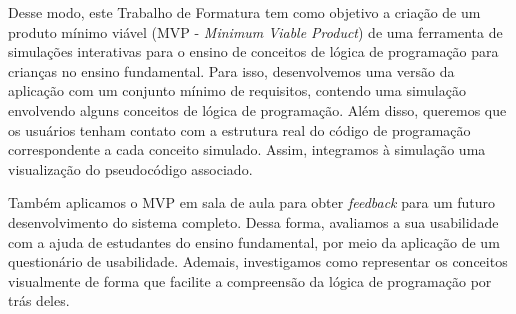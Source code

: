 Desse modo, este Trabalho de Formatura tem como objetivo a criação de um produto mínimo viável (MVP - \textit{Minimum Viable Product}) de uma ferramenta de simulações interativas para o ensino de conceitos de lógica de programação para crianças no ensino fundamental. Para isso, 
desenvolvemos uma versão da aplicação com um conjunto mínimo de requisitos, contendo uma simulação envolvendo alguns conceitos de lógica de programação. Além disso, queremos que os usuários tenham contato com a estrutura real do código de programação correspondente a cada conceito simulado. Assim, integramos à simulação uma visualização do pseudocódigo associado.

Também aplicamos o MVP em sala de aula para obter \textit{feedback} para um futuro desenvolvimento do sistema completo. Dessa forma, avaliamos a sua usabilidade com a ajuda de estudantes do ensino fundamental, por meio da aplicação de um questionário de usabilidade. Ademais, investigamos como representar os conceitos visualmente de forma que facilite a compreensão da lógica de programação por trás deles.
